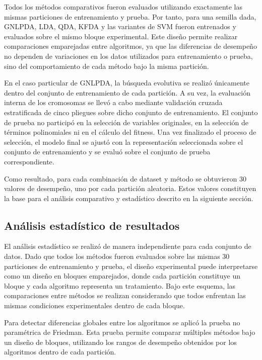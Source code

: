 Todos los métodos comparativos fueron evaluados utilizando exactamente las mismas
particiones de entrenamiento y prueba. Por tanto, para una semilla dada, GNLPDA, LDA, QDA, KFDA y las variantes de SVM fueron entrenados y evaluados sobre el mismo bloque experimental. Este diseño permite realizar comparaciones emparejadas entre algoritmos, ya que las diferencias de desempeño no dependen de variaciones en los datos utilizados para entrenamiento o prueba, sino del comportamiento de cada método bajo la misma partición.

En el caso particular de GNLPDA, la búsqueda evolutiva se realizó únicamente dentro del conjunto de entrenamiento de cada partición. A su vez, la evaluación interna de los cromosomas se llevó a cabo mediante validación cruzada estratificada de cinco pliegues sobre dicho conjunto de entrenamiento. El conjunto de prueba no participó en la selección de variables originales, en la selección de términos polinomiales ni en el cálculo del fitness. Una vez finalizado el proceso de selección, el modelo final se ajustó con la representación seleccionada sobre el conjunto de entrenamiento y se evaluó sobre el conjunto de prueba correspondiente.

Como resultado, para cada combinación de dataset y método se obtuvieron 30 valores de desempeño, uno por cada partición aleatoria. Estos valores constituyen la base para el análisis comparativo y estadístico descrito en la siguiente sección.

\subsection{Análisis estadístico de resultados}

El análisis estadístico se realizó de manera independiente para cada conjunto de datos. Dado que todos los métodos fueron evaluados sobre las mismas 30 particiones de entrenamiento y prueba, el diseño experimental puede interpretarse como un diseño en bloques emparejados, donde cada partición constituye un bloque y cada algoritmo representa un tratamiento. Bajo este esquema, las comparaciones entre métodos se realizan considerando que todos enfrentan las mismas condiciones experimentales dentro de cada bloque.

Para detectar diferencias globales entre los algoritmos se aplicó la prueba no paramétrica de Friedman. Esta prueba permite comparar múltiples métodos bajo un diseño de bloques, utilizando los rangos de desempeño obtenidos por los algoritmos dentro de cada partición.

